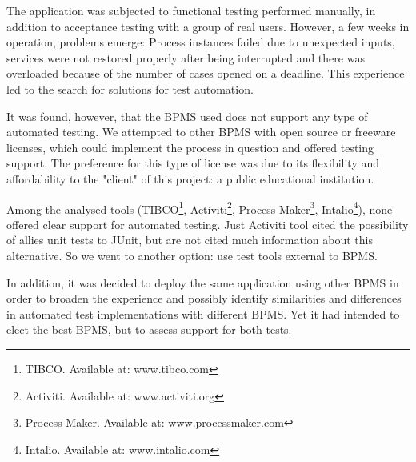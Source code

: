 \documentclass[runningheads,a4paper]{llncs}
\begin{document}
The application was subjected to functional testing performed manually, in addition to acceptance testing with a group of real users. However, a few weeks in operation, problems emerge: Process instances failed due to unexpected inputs, services were not restored properly after being interrupted and there was overloaded because of the number of cases opened on a deadline. This experience led to the search for solutions for test automation.

It was found, however, that the BPMS used does not support any type of automated testing. We attempted to other BPMS with open source or freeware licenses, which could implement the process in question and offered testing support. The preference for this type of license was due to its flexibility and affordability to the "client" of this project: a public educational institution.


Among the analysed tools (TIBCO\footnote{TIBCO. Available at: www.tibco.com}, Activiti\footnote{Activiti. Available at: www.activiti.org}, Process Maker\footnote{Process Maker. Available at: www.processmaker.com}, Intalio\footnote{Intalio. Available at: www.intalio.com}), none offered clear support for automated testing. Just Activiti tool cited the possibility of allies unit tests to JUnit, but are not cited much information about this alternative. So we went to another option: use test tools external to BPMS.

In addition, it was decided to deploy the same application using other BPMS in order to broaden the experience and possibly identify similarities and differences in automated test implementations with different BPMS. Yet it had intended to elect the best BPMS, but to assess support for both tests.
\end{document}
